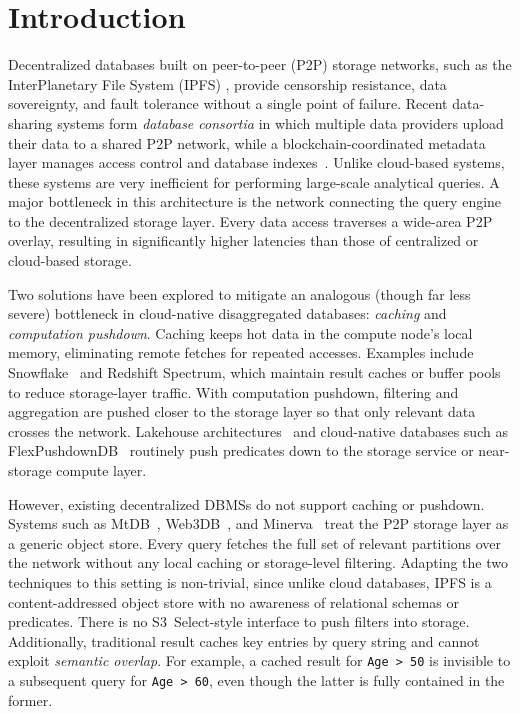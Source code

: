 \section{Introduction}

Decentralized databases built on peer-to-peer (P2P) storage networks, such as the InterPlanetary File System (IPFS) \cite{benet2014ipfs}, provide censorship resistance, data sovereignty, and fault tolerance without a single point of failure. Recent data-sharing systems form \emph{database consortia} in which multiple data providers upload their data to a shared P2P network, while a blockchain-coordinated metadata layer manages access control and database indexes~\cite {hossain2025mtdb, mukherjee2025web3db}. Unlike cloud-based systems\cite{dageville2016snowflake,hunt2018s3, pandis2021evolution}, these systems are very inefficient for performing large-scale analytical queries. A major bottleneck in this architecture is the network connecting the query engine to the decentralized storage layer. Every data access traverses a wide-area P2P overlay, resulting in significantly higher latencies than those of centralized or cloud-based storage.

Two solutions have been explored to mitigate an analogous (though far less severe) bottleneck in cloud-native disaggregated databases: \emph{caching} and \emph{computation pushdown}. Caching keeps hot data in the compute node's local memory, eliminating remote fetches for repeated accesses. Examples include Snowflake~\cite{dageville2016snowflake} and Redshift Spectrum\cite{pandis2021evolution}, which maintain result caches or buffer pools to reduce storage-layer traffic. With computation pushdown, filtering and aggregation are pushed closer to the storage layer so that only relevant data crosses the network. Lakehouse architectures~\cite{armbrust2021lakehouse} and cloud-native databases such as FlexPushdownDB~\cite{yang2021flexpushdowndb} routinely push predicates down to the storage service or near-storage compute layer.

However, existing decentralized DBMSs do not support caching or pushdown. Systems such as MtDB~\cite{hossain2025mtdb}, Web3DB~\cite{mukherjee2025web3db}, and Minerva~\cite{yao2024minerva} treat the P2P storage layer as a generic object store. Every query fetches the full set of relevant partitions over the network without any local caching or storage-level filtering. Adapting the two techniques to this setting is non-trivial, since unlike cloud databases, IPFS is a content-addressed object store with no awareness of relational schemas or predicates. There is no S3~Select-style\cite{hunt2018s3} interface to push filters into storage. Additionally, traditional result caches key entries by query string and cannot exploit \emph{semantic overlap}. For example, a cached result for \texttt{Age~>~50} is invisible to a subsequent query for \texttt{Age~>~60}, even though the latter is fully contained in the former.

